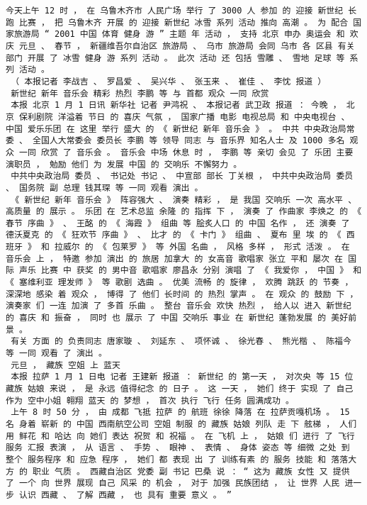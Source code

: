 \documentclass{article}
\begin{document}
\begin{Verbatim}[commandchars=\\\{\}]
 今天上午 12 时 ， 在 乌鲁木齐市 人民广场 举行 了 3000 人 参加 的 迎接 新世纪 长跑 比赛 ， 把 乌鲁木齐 开展 的 迎接 新世纪 冰雪 系列 活动 推向 高潮 。 为 配合 国家旅游局 “ 2001 中国 体育 健身 游 ” 主题 年 活动 ， 支持 北京 申办 奥运会 和 欢庆 元旦 、 春节 ， 新疆维吾尔自治区 旅游局 、 乌市 旅游局 会同 乌市 各 区县 有关 部门 开展 了 冰雪 健身 游 系列 活动 。 此次 活动 还 包括 雪雕 、 雪地 足球 等 系列 活动 。 
 （ 本报记者 李战吉 、 罗昌爱 、 吴兴华 、 张玉来 、 崔佳 、 李忱 报道 ） 
 新世纪 新年 音乐会 精彩 热烈 李鹏 等 与 首都 观众 一同 欣赏 
 本报 北京 1 月 1 日讯 新华社 记者 尹鸿祝 、 本报记者 武卫政 报道 ： 今晚 ， 北京 保利剧院 洋溢着 节日 的 喜庆 气氛 ， 国家广播 电影 电视总局 和 中央电视台 、 中国 爱乐乐团 在 这里 举行 盛大 的 《 新世纪 新年 音乐会 》 。 中共 中央政治局常委 、 全国人大常委会 委员长 李鹏 等 领导 同志 与 音乐界 知名人士 及 1000 多名 观众 一同 欣赏 了 音乐会 。 音乐会 中场 休息 时 ， 李鹏 等 亲切 会见 了 乐团 主要 演职员 ， 勉励 他们 为 发展 中国 的 交响乐 不懈努力 。 
 中共中央政治局 委员 、 书记处 书记 、 中宣部 部长 丁关根 ， 中共中央政治局 委员 、 国务院 副 总理 钱其琛 等 一同 观看 演出 。 
 《 新世纪 新年 音乐会 》 阵容强大 、 演奏 精彩 ， 是 我国 交响乐 一次 高水平 、 高质量 的 展示 。 乐团 在 艺术总监 余隆 的 指挥 下 ， 演奏 了 作曲家 李焕之 的 《 春节 序曲 》 、 王酩 的 《 海霞 》 组曲 等 脍炙人口 的 中国 名作 ， 还 演奏 了 德沃夏克 的 《 狂欢节 序曲 》 、 比才 的 《 卡门 》 组曲 、 夏布 里 埃 的 《 西班牙 》 和 拉威尔 的 《 包莱罗 》 等 外国 名曲 ， 风格 多样 ， 形式 活泼 。 在 音乐会 上 ， 特邀 参加 演出 的 旅居 加拿大 的 女高音 歌唱家 张立 平和 屡次 在 国际 声乐 比赛 中 获奖 的 男中音 歌唱家 廖昌永 分别 演唱 了 《 我爱你 ， 中国 》 和 《 塞维利亚 理发师 》 等 歌剧 选曲 。 优美 流畅 的 旋律 ， 欢腾 跳跃 的 节奏 ， 深深地 感染 着 观众 ， 博得 了 他们 长时间 的 热烈 掌声 。 在 观众 的 鼓励 下 ， 演奏家 们 一连 加演 了 多首 乐曲 。 整台 音乐会 欢快 热烈 ， 给人以 进入 新世纪 的 喜庆 和 振奋 ， 同时 也 展示 了 中国 交响乐 事业 在 新世纪 蓬勃发展 的 美好前景 。 
 有关 方面 的 负责同志 唐家璇 、 刘延东 、 项怀诚 、 徐光春 、 熊光楷 、 陈福今 等 一同 观看 了 演出 。 
 元旦 ， 藏族 空姐 上 蓝天 
 本报 拉萨 1 月 1 日电 记者 王建新 报道 ： 新世纪 的 第一天 ， 对次央 等 15 位 藏族 姑娘 来说 ， 是 永远 值得纪念 的 日子 。 这 一天 ， 她们 终于 实现 了 自己 作为 空中小姐 翱翔 蓝天 的 梦想 ， 首次 执行 飞行 任务 圆满成功 。 
 上午 8 时 50 分 ， 由 成都 飞抵 拉萨 的 航班 徐徐 降落 在 拉萨贡嘎机场 。 15 名 身着 崭新 的 中国 西南航空公司 空姐 制服 的 藏族 姑娘 列队 走 下 舷梯 ， 人们 用 鲜花 和 哈达 向 她们 表达 祝贺 和 祝福 。 在 飞机 上 ， 姑娘 们 进行 了 飞行 服务 汇报 表演 ， 从 语言 、 手势 、 眼神 、 表情 、 身体 姿态 等 细微 之处 到 整个 服务程序 和 应急 程序 ， 她们 都 表现 出 了 训练有素 的 服务 技能 和 落落大方 的 职业 气质 。 西藏自治区 党委 副 书记 巴桑 说 ： “ 这为 藏族 女性 又 提供 了 一个 向 世界 展现 自己 风采 的 机会 ， 对于 加强 民族团结 ， 让 世界 人民 进一步 认识 西藏 、 了解 西藏 ， 也 具有 重要 意义 。 ” 

\end{Verbatim}
\end{document}
